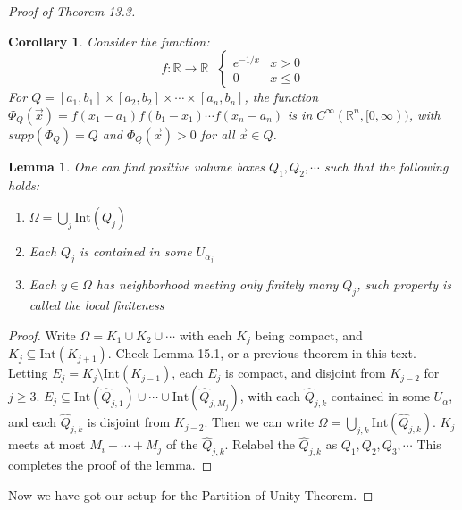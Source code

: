 \documentclass[11pt,oneside]{book}
\theoremstyle{break}
\theoremstyle{break}
\newtheorem{lem}{Lemma}[thm]
\newtheorem{corL}{Corollary}[lem]
\newcommand{\R}{\mathbb{R}}
\newcommand{\Int}{\text{Int}}
\begin{document}
\begin{proof}[Proof of Theorem 13.3]
\begin{corL}
\setlength{\leftskip}{1cm}Consider the function: 
$$f:\R \to \R \ \ \ \begin{cases}e^{-1/x} &x>0\\0&x\leq 0  \end{cases}$$
For $Q = [a_1,b_1]\times [a_2,b_2] \times \cdots \times [a_n,b_n]$, the function $\Phi_Q(\vec{x}) = f(x_1-a_1)f(b_1-x_1)\cdots f(x_n-a_n)$ is in $C^\infty(\R^n,[0,\infty))$, with $supp(\Phi_Q) = Q$ and $\Phi_Q (\vec{x})> 0$ for all $\vec{x}\in Q$. 
\end{corL}


\begin{lem}
\setlength{\leftskip}{1cm}One can find positive volume boxes $Q_1,Q_2,\cdots$ such that the following holds:
\begin{enumerate}[topsep=3pt,itemsep=-1ex,partopsep=1ex,parsep=1ex,leftmargin=1.5cm]
\item $\Omega = \bigcup_j \Int(Q_j)$
\item Each $Q_j$ is contained in some $U_{\alpha_j}$
\item Each $y \in \Omega$ has neighborhood meeting only finitely many $Q_j$, such property is called the local finiteness 
\end{enumerate} 
\end{lem}
\begin{proof}
\setlength{\leftskip}{1cm}Write $\Omega = K_1 \cup K_2\cup \cdots$ with each $K_j$ being compact, and $K_j \subseteq \Int(K_{j+1})$. Check Lemma 15.1, or a previous theorem in this text. Letting $E_j = K_j \setminus \Int(K_{j-1})$, each $E_j$ is compact, and disjoint from $K_{j-2}$ for $j \geq 3$. $E_j \subseteq \Int(\hat{Q}_{j,1}) \cup \cdots \cup \Int(\hat{Q}_{j,M_j})$, with each $\hat{Q}_{j,k}$ contained in some $U_\alpha$, and each $\hat{Q}_{j,k}$ is disjoint from $K_{j-2}$. Then we can write $\Omega = \bigcup_{j,k} \Int(\hat{Q}_{j,k})$. $K_j$ meets at most $M_{i} + \cdots + M_j$ of the $\hat{Q}_{j,k}$. Relabel the $\hat{Q}_{j,k}$ as $Q_1,Q_2,Q_3,\cdots$ This completes the proof of the lemma. 
\end{proof}

Now we have got our setup for the Partition of Unity Theorem.


\end{proof}
\end{document}
